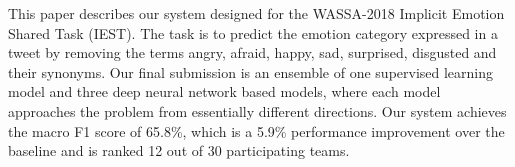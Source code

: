 This paper describes our system designed for the WASSA-2018 Implicit Emotion Shared Task (IEST). The task is to predict the emotion category expressed in a tweet by removing the terms angry, afraid, happy, sad, surprised, disgusted and their synonyms. Our final submission is an ensemble of one supervised learning model and three deep neural network based models, where each model approaches the problem from essentially different directions. Our system achieves the macro F1 score of 65.8\%, which is a 5.9\% performance improvement over the baseline and is ranked 12 out of 30 participating teams.
